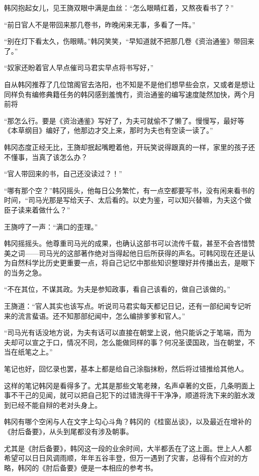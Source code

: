 韩冈抱起女儿，见王旖双眼中满是血丝：“怎么眼睛红着，又熬夜看书了？”

“前日官人不是带回来那几卷书，昨晚闲来无事，多看了一阵。”

“别在灯下看太久，伤眼睛。”韩冈笑笑，“早知道就不把那几卷《资治通鉴》带回来了。”

“奴家还盼着官人早点催司马君实早点将书写好，”

自从韩冈推荐了几位馆阁官去洛阳，也不知是不是他们想早些会京，又或者是想让同样负有编修典籍任务的韩冈感到羞愧冇，资治通鉴的编写速度陡然加快，两个月前将

“那怎么行。要是《资治通鉴》写好了，为夫可就偷不了懒了。慢慢写，最好等《本草纲目》编好了，他那边才交上来，那时为夫也有空读一读了。”

韩冈态度正经无比，王旖却抿起嘴瞪着他，开玩笑说得跟真的一样，家里的孩子还不懂事，当真了该怎么办？

“官人带回来的书，自己还没读过？！”

“哪有那个空？”韩冈摇头，他每日公务繁忙，有一点空都要写书，没有闲来看书的时间，“司马光那是写给天子、太后看的。以史为鉴，可以知兴替嘛，为夫这个做臣子读来着做什么？”

王旖哼了一声：“满口的歪理。”

韩冈摇摇头。他尊重司马光的成果，也确认这部书可以流传千载，甚至不会吝惜赞美之词——司马光的这部著作绝对当得起他日后所获得的声名。可韩冈现在还是认为自然科学比历史更重要一点，将自己记忆中那些知识整理好并传播出去，是眼下的当务之急。

“不在其位，不谋其政。为夫是参知政事，看自己该看的，做自己该做的。”

王旖道：“官人其实也该写点。听说司马君实每天都记日记，还有一部纪闻专记听来的流言蜚语。还不知那部纪闻中，怎么编排爹爹和官人。”

“司马光有话没地方说，为夫有话可以直接在朝堂上说，他只能诉之于笔端，而为夫却可以宣之于口，情况不同，怎么能做同样的事？何况圣谟国政，当在朝堂，不当在纸笔之上。”

笔记也好，回忆录也罢，基本上都是给自己涂脂抹粉，然后将过错推给其他人。

这样的笔记韩冈是看得多了。尤其是那些文笔老辣，名声卓著的文臣，几条明面上事不干己的见闻，就可以把自己犯下的过错洗得干干净净，顺道将洗下来的脏水泼到已经不能自辩的老对头身上。

韩冈有哪个空闲与人在文字上勾心斗角？韩冈的《桂窗丛谈》，以及最近在增补的《肘后备要》，从头到尾都没有涉及朝事。

尤其是《肘后备要》，韩冈这一段的业余时间，大半都丢在了这上面。世上人人都希望可以日日风调雨顺，年年五谷丰登，但万一遇到了灾害，总得有个应对的方略，韩冈的《肘后备要》便是一本相应的参考书。

